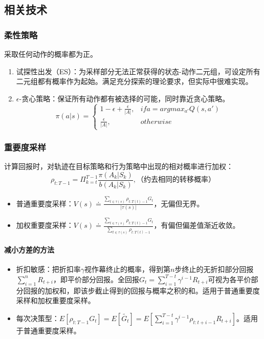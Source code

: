 \documentclass[
12pt, %
a4paper, 
oneside, %
headinclude,footinclude, %
]{scrartcl}
\begin{document}
\subsection{相关技术}
\subsubsection{柔性策略}
采取任何动作的概率都为正。
\begin{enumerate}
\item 试探性出发（ES）：为采样部分无法正常获得的状态-动作二元组，可设定所有二元组都有概率作为起始。满足充分探索的理论要求，但实际中很难实现。
\item $ \epsilon $-贪心策略：保证所有动作都有被选择的可能，同时靠近贪心策略。
$$
\pi(a|s) = 
\begin{cases} 
1 - \epsilon + \frac{\epsilon}{|A|}, &if a = argmax_{a'} Q(s, a') \\
\frac{\epsilon}{|A|}, &otherwise
\end{cases}
$$
\end{enumerate}
\subsubsection{重要度采样}
计算回报时，对轨迹在目标策略和行为策略中出现的相对概率进行加权：
$$
\rho_{t:T - 1} = \Pi_{k = t}^{T - 1} \frac{\pi(A_k|S_k)}{b(A_k|S_k)}, \text{（约去相同的转移概率）}
$$
\begin{itemize}
\item 普通重要度采样：$ V(s) \doteq \frac{\sum_{t \in \tau(s)} \rho_{t:T(t) - 1}G_t}{|\tau(s)|} $，无偏但无界。
\item 加权重要度采样：$ V(s) \doteq \frac{\sum_{t \in \tau(s)} \rho_{t:T(t) - 1}G_t}{\sum_{t \in \tau(s)} \rho_{t:T(t) - 1}} $，有偏但偏差值渐近收敛。
\end{itemize}
\paragraph{减小方差的方法}
\begin{itemize}
\item 折扣敏感：把折扣率$ \gamma $视作幕终止的概率，得到第$ n $步终止的无折扣部分回报$ \sum_{i = 1}^n R_{t + i} $，即平价部分回报。全回报$ G_t = \sum_{i = 1}^{T - t} \gamma^{i - 1}R_{t + i} $可视为各平价部分回报的加权和，即该步截止得到的回报与概率之积的和。适用于普通重要度采样和加权重要度采样。
\item 每次决策型：$ E[\rho_{t:T - 1}G_t] = E[\tilde{G_t}] = E[\sum_{i = 1}^{T - t} \gamma^{i - 1} \rho_{t:t + i - 1}R_{t + i}] $。适用于普通重要度采样。
\end{itemize}
\end{document}
